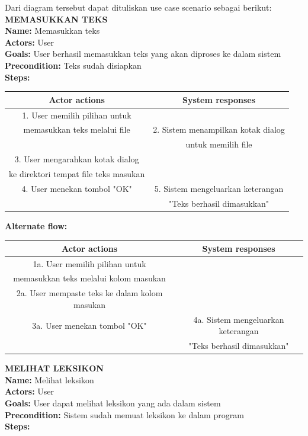Dari diagram tersebut dapat dituliskan use case scenario sebagai berikut:\\

\textbf{MEMASUKKAN TEKS}\\
\textbf{Name:} Memasukkan teks\\
\textbf{Actors:} User\\
\textbf{Goals:} User berhasil memasukkan teks yang akan diproses ke dalam sistem\\
\textbf{Precondition:} Teks sudah disiapkan\\
\textbf{Steps:}

\begin{table}[H]
\centering
\begin{tabular}{|c|c|}
\hline
\textbf{Actor actions} & \textbf{System responses} \\
\hline
1. User memilih pilihan untuk& \\memasukkan teks melalui file&
2. Sistem menampilkan kotak dialog \\&untuk memilih file\\
3. User mengarahkan kotak dialog&\\ ke direktori tempat file teks masukan&\\
4. User menekan tombol "OK"&
5. Sistem mengeluarkan keterangan \\&"Teks berhasil dimasukkan"\\
\hline
\end{tabular}
\end{table}

\textbf{Alternate flow:}

\begin{table}[H]
\centering
\begin{tabular}{|c|c|}
\hline
\textbf{Actor actions} & \textbf{System responses} \\
\hline
1a. User memilih pilihan untuk& \\memasukkan teks melalui kolom masukan&\\
2a. User mempaste teks ke dalam kolom masukan&\\
3a. User menekan tombol "OK"& 
4a. Sistem mengeluarkan keterangan \\&"Teks berhasil dimasukkan" \\
\hline
\end{tabular}
\end{table}

\textbf{MELIHAT LEKSIKON}\\
\textbf{Name:} Melihat leksikon\\
\textbf{Actors:} User\\
\textbf{Goals:} User dapat melihat leksikon yang ada dalam sistem\\
\textbf{Precondition:} Sistem sudah memuat leksikon ke dalam program\\
\textbf{Steps:}

